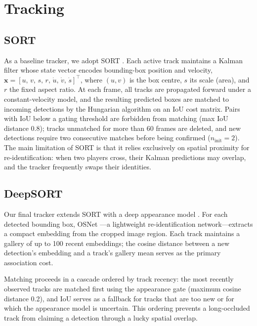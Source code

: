 \section{Tracking}\label{sec:tracking}

\subsection{SORT}
As a baseline tracker, we adopt SORT \cite{sort}.
Each active track maintains a Kalman filter whose state vector encodes bounding-box
position and velocity,
$\mathbf{x} = [u,\,v,\,s,\,r,\,\dot{u},\,\dot{v},\,\dot{s}]^\top$,
where $(u,v)$ is the box centre, $s$ its scale (area), and $r$ the fixed aspect
ratio.
At each frame, all tracks are propagated forward under a constant-velocity model,
and the resulting predicted boxes are matched to incoming detections by the
Hungarian algorithm on an IoU cost matrix.
Pairs with IoU below a gating threshold are forbidden from matching (max IoU
distance 0.8); tracks unmatched for more than 60 frames are deleted, and new
detections require two consecutive matches before being confirmed ($n_{\mathrm{init}}=2$).
The main limitation of SORT is that it relies exclusively on spatial proximity for
re-identification: when two players cross, their Kalman predictions may overlap, and
the tracker frequently swaps their identities.

\subsection{DeepSORT}
Our final tracker extends SORT with a deep appearance model \cite{deepsort}.
For each detected bounding box, OSNet \cite{reid}---a lightweight re-identification
network---extracts a compact embedding from the cropped image region.
Each track maintains a gallery of up to 100 recent embeddings; the cosine distance
between a new detection's embedding and a track's gallery mean serves as the primary
association cost.

Matching proceeds in a cascade ordered by track recency: the most recently observed
tracks are matched first using the appearance gate (maximum cosine distance 0.2),
and IoU serves as a fallback for tracks that are too new or for which the appearance
model is uncertain.
This ordering prevents a long-occluded track from claiming a detection through a
lucky spatial overlap.

